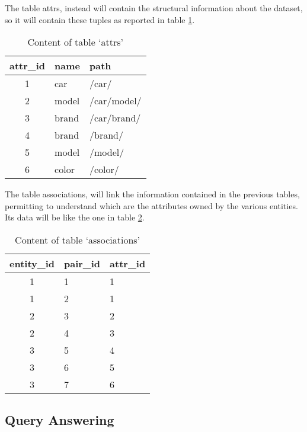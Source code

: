 \documentclass{acm_proc_article-sp-sigmod07}
\begin{document}
The table attrs, instead will contain the structural information
about the dataset, so it will contain these tuples as reported in table
\ref{tabat1}.

\begin{table}
\begin{tabular}{|c|l|l|}
\hline
attr\_id & name & path \\
\hline
1 & car   & /car/ \\
2 & model & /car/model/ \\
3 & brand & /car/brand/ \\
4 & brand & /brand/ \\
5 & model & /model/ \\
6 & color & /color/ \\ 
\hline
\end{tabular}
\caption{Content of table `attrs'}
\label{tabat1}
\end{table}

The table associations, will link the information contained in the
previous tables, permitting to understand which are the attributes owned
by the various entities. Its data will be like the one in table
\ref{tabas1}.

\begin{table}
\begin{tabular}{|c|l|l|}
\hline
entity\_id & pair\_id & attr\_id \\
\hline
1 & 1 & 1 \\
1 & 2 & 1 \\
2 & 3 & 2 \\
2 & 4 & 3 \\
3 & 5 & 4 \\
3 & 6 & 5 \\
3 & 7 & 6 \\
\hline
\end{tabular}
\caption{Content of table `associations'}
\label{tabas1}
\end{table}

\subsection{Query Answering}








\end{document}
